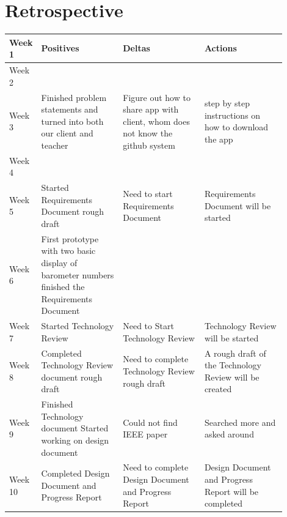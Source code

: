 \documentclass[onecolumn, draftclsnofoot,10pt, compsoc]{IEEEtran}
\begin{document}
\section{Retrospective}
\begin{center}
	\begin{tabular}{| l | p{0.3\linewidth} | p{0.3\linewidth} | p{0.3\linewidth} |}
		\hline
		Week 1 & Positives & Deltas & Actions \\ \hline
		Week 2 & & & \\ \hline				%
		Week 3 & Finished problem statements and turned into both our client and teacher
 & Figure out how to share app with client, whom does not know the github system
 & step by step instructions on how to download the app \\ \hline
		Week 4 & & & \\ \hline
		Week 5 & Started Requirements Document rough draft & Need to start Requirements Document & Requirements Document will be started \\ \hline
		Week 6 & First prototype with two basic display of barometer numbers
  finished the Requirements Document & & \\ \hline
		Week 7 & Started Technology Review & Need to Start Technology Review & Technology Review will be started \\ \hline
		Week 8 & Completed Technology Review document rough draft & Need to complete Technology Review rough draft & A rough draft of the Technology Review will be created \\ \hline
		Week 9 &Finished Technology document
Started working on design document
 & Could not find IEEE paper & Searched more and asked around\\ \hline
		Week 10 & Completed Design Document and Progress Report & Need to complete Design Document and Progress Report & Design Document and Progress Report will be completed \\ \hline

	\end{tabular}
\end{center}
\end{document}
